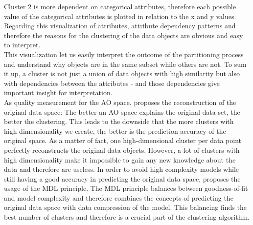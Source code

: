 \documentclass[conference]{IEEEtran}
\begin{document}
Cluster 2 is more dependent on categorical attributes, therefore each possible value of the categorical attributes is plotted in relation to the x and y values. 
Regarding this visualization of attributes, attribute dependency patterns and therefore the reasons for the clustering of the data objects are obvious and easy to interpret.
\\
This visualization let us easily interpret the outcome of the partitioning process and understand why objects are in the same subset while others are not. To sum it up, a cluster is not just a union of data objects with high similarity but also with dependencies between the attributes - and those dependencies give important insight for interpretation.
\\
As quality measurement for the AO space, \cite{scenic} proposes the reconstruction of the original data space: The better an AO space explains the original data set, the better the clustering. This leads to the downside that the more clusters with high-dimensionality we create, the better is the prediction accuracy of the original space. As a matter of fact, one high-dimensional cluster per data point perfectly reconstructs the original data objects. However, a lot of clusters with high dimensionality make it impossible to gain any new knowledge about the data and therefore are useless. In order to avoid high  complexity models while still having a good accuracy in predicting the original data space, \cite{scenic} proposes the usage of the MDL principle. The MDL principle balances between goodness-of-fit and model complexity and therefore combines the concepts of predicting the original data space with data compression of the model. This balancing finds the best number of clusters and therefore is a crucial part of the clustering algorithm.
\end{document}
